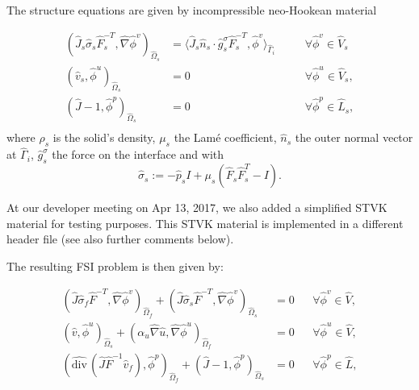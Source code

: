 The structure equations are given by incompressible neo-Hookean material
  
\begin{Problem}
  \begin{equation*}
    \begin{aligned}
      (\hat J_s \hat\sigma_s \hat F_s^{-T},\hat\nabla\hat\phi^v)_{\hat\Omega_s}
      &= \langle\hat J_s\hat n_s\cdot \hat g_s^\sigma\hat
      F_s^{-T},\hat\phi^v  \rangle_{\hat\Gamma_i}
      &&\quad\forall\hat \phi^v\in\hat V_s\\
      (\hat v_s,\hat\phi^u)_{\hat\Omega_s}&=0
      &&\quad\forall\hat \phi^u\in\hat V_s    ,\\
      (\hat J-1,\hat\phi^p)_{\hat\Omega_s} &=0
      &&\quad\forall\hat \phi^p\in\hat L_s,\\
    \end{aligned}
  \end{equation*}
  where $\rho_s$ is the solid's density, $\mu_s$ the Lam\'e
  coefficient, $\hat n_s$ the outer normal vector at $\hat\Gamma_i$, 
  $\hat g_s^\sigma$ the force on the interface and with  
  \[
  \hat\sigma_s:=-\hat p_sI+\mu_s(\hat F_s\hat F_s^T-I).
  \]
\end{Problem}
\begin{remark}
At our developer meeting on Apr 13, 2017, we also added 
a simplified STVK material for testing purposes. This STVK 
material is implemented in a different header file (see also 
further comments below).
\end{remark}


The resulting FSI problem is then given by: 
\begin{Problem}
  \begin{equation*}
    \begin{aligned}
      (\hat J\hat\sigma_f\hat F^{-T},\hat \nabla\hat\phi^v)_{\hat\Omega_f}
      + (\hat J\hat\sigma_s\hat F^{-T},\hat \nabla\hat\phi^v)_{\hat\Omega_s}
      &= 0&&\forall\hat\phi^v\in \hat V,\\
      (\hat v,\hat\phi^u)_{\hat\Omega_s}
      + (\alpha_u \hat \nabla \hat u,\hat \nabla\hat\phi^u)_{\hat\Omega_f}
      &=0&&\forall\hat\phi^u\in \hat V,\\
      (\widehat{\text{div}}\,(\hat J\hat F^{-1}\hat
      v_f),\hat\phi^p)_{\hat\Omega_f} 
      + (\hat J - 1,\hat \phi^p)_{\hat\Omega_s}
      &=0&&\forall\hat \phi^p\in \hat L,
    \end{aligned}
  \end{equation*}  
\end{Problem}


